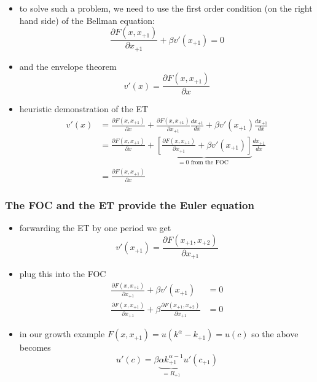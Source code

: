 \documentclass[compress,aspectratio=169]{beamer}
\begin{document}
\begin{frame}
\begin{itemize}
\item to solve such a problem, we need to use the first order condition (on the right hand side) of the Bellman equation:
\begin{displaymath}
\frac{\partial F(x,x_{+1})}{\partial x_{+1}}+\beta v'(x_{+1})=0
\end{displaymath}
\item and the envelope theorem
\begin{displaymath}
v'(x) = \frac{\partial F(x,x_{+1})}{\partial x}
\end{displaymath}
\item heuristic demonstration of the ET
\begin{align*}
v'(x) & = \frac{\partial F(x,x_{+1})}{\partial x}+\frac{\partial F(x,x_{+1})}{\partial x_{+1}}\frac{dx_{+1}}{dx}+\beta v'(x_{+1})\frac{dx_{+1}}{dx} \\
& = \frac{\partial F(x,x_{+1})}{\partial x}+\underbrace{\left[ \frac{\partial F(x,x_{+1})}{\partial x_{+1}}+\beta v'(x_{+1})\right]}_{=0 \text{ from the FOC }}\frac{dx_{+1}}{dx}\\
& = \frac{\partial F(x,x_{+1})}{\partial x}
\end{align*}
\end{itemize}
\end{frame}

\begin{frame}
\frametitle{The FOC and the ET provide the Euler equation}
\begin{itemize}
\item forwarding the ET by one period we get
\begin{displaymath}
v'(x_{+1})=\frac{\partial F(x_{+1},x_{+2})}{\partial x_{+1}}
\end{displaymath}
\item plug this into the FOC
\begin{align*}
\frac{\partial F(x,x_{+1})}{\partial x_{+1}}+\beta v'(x_{+1})& =0 \\
\frac{\partial F(x,x_{+1})}{\partial x_{+1}}+\beta \frac{\partial F(x_{+1},x_{+2})}{\partial x_{+1}}& =0
\end{align*}
\item in our growth example $F(x,x_{+1})=u (k^{\alpha}-k_{+1})=u(c)$ so the above becomes
\begin{displaymath}
u'(c)=\beta \underbrace{\alpha k_{+1}^{\alpha-1}}_{=R_{+1}} u'(c_{+1})
\end{displaymath}
\end{itemize}
\end{frame}
\end{document}
